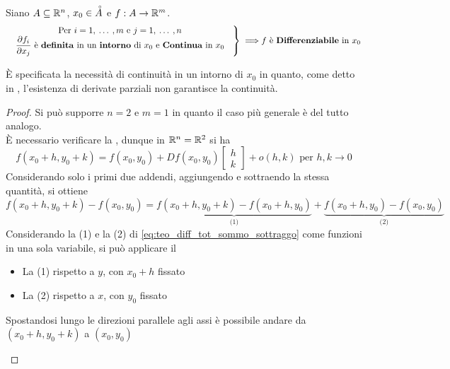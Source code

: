 \begin{theorem}
	\label{teo:diff_tot}
	Siano $A \subseteq \mathbb{R}^n$, $x_0 \in \accentset{\circ}{A}$ e $f:A \to \mathbb{R}^m$.
	\[
		\left.
		\text{
			\begin{tabular}{c}
				Per $i = 1,\:\dotsc\:,m$ e $j = 1,\:\dotsc\:,n$\\
				$\frac{\partial f_i}{\partial x_j}$ è \textbf{definita} in un \textbf{intorno} di $x_0$ e \textbf{Continua} in $x_0$
			\end{tabular}
		}
		\right\}
		\implies\\
		f \text{ è \textbf{Differenziabile} in } x_0
	\]
	\vspace*{-\baselineskip}
	\begin{note}
		È specificata la necessità di continuità in un intorno di $x_0$ in quanto, come detto in , l'esistenza di derivate parziali non garantisce la continuità.
	\end{note}
	\begin{proof}
		Si può supporre $n = 2$ e $m = 1$ in quanto il caso più generale è del tutto analogo.\\
		È necessario verificare la , dunque in $\mathbb{R}^n = \mathbb{R}^2$ si ha
		\begin{equation}
			\label{eq:deriv_tot_def_diff}
			f(x_0 + h, y_0 + k) = f(x_0, y_0) + Df(x_0, y_0) \begin{bmatrix}h\\k\end{bmatrix} + o(h,k) \text{ per } h,k \to 0
		\end{equation}
		Considerando solo i primi due addendi, aggiungendo e sottraendo la stessa quantità, si ottiene
		\begin{equation}
			\label{eq:teo_diff_tot_sommo_sottraggo}
			f(x_0 + h, y_0 + k) - f(x_0, y_0) = \underbrace{f(x_0 + h, y_0 + k) - f(x_0+h,y_0)}_{\text{(1)}} + \underbrace{f(x_0+h,y_0) - f(x_0, y_0)}_{\text{(2)}}
		\end{equation}
		Considerando la (1) e la (2) di \cref{eq:teo_diff_tot_sommo_sottraggo} come funzioni in una sola variabile, si può applicare il 
		\begin{itemize}
			\item La (1) rispetto a $y$, con $x_0 + h$ fissato
			\item La (2) rispetto a $x$, con $y_0$ fissato
		\end{itemize}
		Spostandosi lungo le direzioni parallele agli assi è possibile andare da $(x_0 + h, y_0 + k)$ a $(x_0, y_0)$
		\begin{center}
\end{center}
\end{proof}
\end{theorem}

